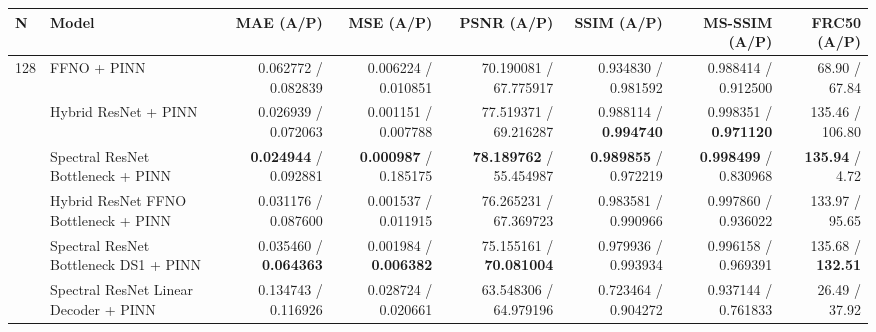 \begin{tabular}{llrrrrrr}
\toprule
N & Model & MAE (A/P) & MSE (A/P) & PSNR (A/P) & SSIM (A/P) & MS-SSIM (A/P) & FRC50 (A/P) \\
\midrule
128 & FFNO + PINN & 0.062772 / 0.082839 & 0.006224 / 0.010851 & 70.190081 / 67.775917 & 0.934830 / 0.981592 & 0.988414 / 0.912500 & 68.90 / 67.84 \\
 & Hybrid ResNet + PINN & 0.026939 / 0.072063 & 0.001151 / 0.007788 & 77.519371 / 69.216287 & 0.988114 / \textbf{0.994740} & 0.998351 / \textbf{0.971120} & 135.46 / 106.80 \\
 & Spectral ResNet Bottleneck + PINN & \textbf{0.024944} / 0.092881 & \textbf{0.000987} / 0.185175 & \textbf{78.189762} / 55.454987 & \textbf{0.989855} / 0.972219 & \textbf{0.998499} / 0.830968 & \textbf{135.94} / 4.72 \\
 & Hybrid ResNet FFNO Bottleneck + PINN & 0.031176 / 0.087600 & 0.001537 / 0.011915 & 76.265231 / 67.369723 & 0.983581 / 0.990966 & 0.997860 / 0.936022 & 133.97 / 95.65 \\
 & Spectral ResNet Bottleneck DS1 + PINN & 0.035460 / \textbf{0.064363} & 0.001984 / \textbf{0.006382} & 75.155161 / \textbf{70.081004} & 0.979936 / 0.993934 & 0.996158 / 0.969391 & 135.68 / \textbf{132.51} \\
 & Spectral ResNet Linear Decoder + PINN & 0.134743 / 0.116926 & 0.028724 / 0.020661 & 63.548306 / 64.979196 & 0.723464 / 0.904272 & 0.937144 / 0.761833 & 26.49 / 37.92 \\
\bottomrule
\end{tabular}
